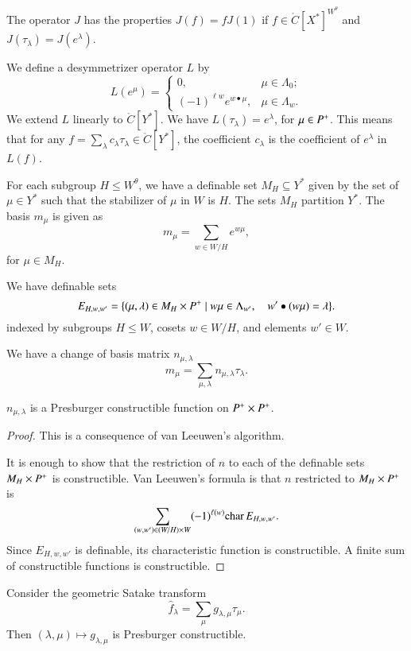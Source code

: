 The operator $J$ has the properties $J(f) = f J(1)$ if $f\in \ring{C}[X^*]^{W^\theta}$ and $J(\tau_\lambda) = J(e^\lambda)$.

We define a desymmetrizer operator $L$ by
\[
L(e^\mu) = \begin{cases}
0,& \mu\in \Lambda_0;\\
(-1)^{\ell{w}} e^{w\bullet \mu},& \mu\in\Lambda_w.
\end{cases}
\]
We extend $L$ linearly to $\ring{C}[Y^*]$.
We have $L(\tau_\lambda) = e^\lambda$, for $\mu\in P^+$.  This means that
for any $f = \sum_\lambda c_\lambda \tau_\lambda \in \ring{C}[Y^*]$, the coefficient $c_\lambda$
is the coefficient of $e^\lambda$ in $L(f)$.

For each subgroup $H\le W^\theta$, we have a definable set
$M_H \subseteq Y^*$ given by the set of $\mu\in Y^*$ such that
the stabilizer of $\mu$ in $W$ is $H$.  
The sets $M_H$ partition $Y^*$. 
The basis $m_\mu$ is given
as 
\[
m_\mu = \sum_{w\in W/H} e^{w \mu},
\]
for $\mu\in M_H$.

We have definable sets 
\[
E_{H,w,w'} = \{(\mu,\lambda)\in M_H\times P^+ \mid w\mu\in\Lambda_{w'},\quad w'\bullet(w\mu)=\lambda\}.
\]
indexed by subgroups $H\le W$, cosets $w\in W/H$, and elements $w'\in W$.

We have a change of basis matrix $n_{\mu,\lambda}$ 
\[
m_\mu = \sum_{\mu,\lambda} n_{\mu,\lambda} \tau_\lambda.
\]

\begin{theorem}\label{lemma:van-leeuwen} $n_{\mu,\lambda}$ is a Presburger constructible function on $P^+\times P^+$.
\end{theorem}

\begin{proof} This is a consequence of van Leeuwen's algorithm. 

It is enough to show that the restriction of $n$ to each of the definable sets
$M_H\times P^+$ is constructible.  Van Leeuwen's formula is that $n$ restricted
to $M_H\times P^+$ is 
\[
\sum_{(w,w')\in (W/H)\times W} (-1)^{\ell(w)} {\operatorname{char}}\, E_{H,w,w'}.
\]
Since $E_{H,w,w'}$ is definable, its characteristic function is constructible.
A finite sum of constructible functions is constructible.
\end{proof}

\begin{corollary} Consider the geometric Satake transform
\[
\hat f_\lambda = \sum_\mu g_{\lambda,\mu} \tau_\mu.
\]
Then $(\lambda,\mu)\mapsto g_{\lambda,\mu}$ is Presburger constructible.
\end{corollary}

